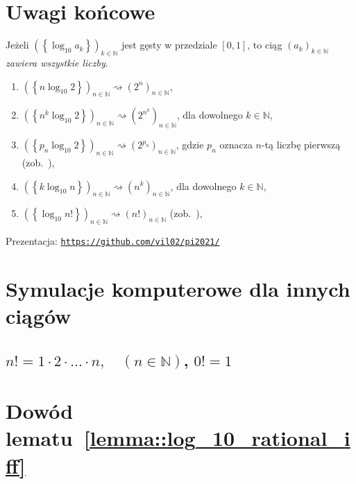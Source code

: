 \documentclass[aspectratio=169]{beamer}
\newcommand{\enumsymbol}{$\triangleright$}
\newcommand{\N}{\mathbb{N}}
\newcommand{\myGithubLink}{https://github.com/vil02/}
\newcommand{\importFromTmpData}[1]{{#1}}
\newcommand{\define}[1]{\textcolor{colorOfDefinition}{\textit{#1}}}
\newcommand{\paren}[1]{\!\left(#1 \right)}
\newcommand{\fracpart}[1]{\left\{ #1 \right\}}
\newcommand{\link}[1]{\href{#1}{\texttt{#1}}}
\begin{document}
\section{Uwagi końcowe}
\begin{frame}
  \begin{theorem}
    Jeżeli $\paren{{\fracpart{\log_{10} a_k}}}_{k \in \N}$ jest gęsty w przedziale  $[0, 1]$, to
    ciąg ${\paren{a_k}}_{k \in \N}$ \define{zawiera wszystkie liczby}.
  \end{theorem}
  \pause{}
  \begin{example}
  \begin{enumerate}[label=\enumsymbol]
    \item<+-> $\paren{\fracpart{n\log_{10}2}}_{n \in \N} \rightsquigarrow \paren{2^n}_{n \in \N}$,
    \item<+-> $\paren{\fracpart{n^k\log_{10}2}}_{n \in \N} \rightsquigarrow \paren{2^{n^k}}_{n \in \N}$, dla dowolnego $k \in \N$,
    \item<+-> $\paren{\fracpart{p_n\log_{10}2}}_{n \in \N} \rightsquigarrow \paren{2^{p_n}}_{n \in \N}$, gdzie $p_n$ oznacza $n$-tą liczbę pierwszą (zob.~\cite{Vinogradov1948}),
    \item<+-> $\paren{\fracpart{k\log_{10}n}}_{n \in \N} \rightsquigarrow \paren{n^k}_{n \in \N}$, dla dowolnego $k \in \N$,
    \item<+-> $\paren{\fracpart{\log_{10}n!}}_{n \in \N} \rightsquigarrow\paren{n!}_{n \in \N}$ (zob.~\cite{Diaconis1977}),
  \end{enumerate}
  \end{example}
  \onslide<+-> Prezentacja: \link{\myGithubLink pi2021/}
\end{frame}

\appendix

\section{Symulacje komputerowe dla innych ciągów}

\importFromTmpData{\powSubstrPlotsTex}

\subsection{\texorpdfstring{$n! = 1\cdot2\cdot \ldots \cdot n, \quad \paren{n \in \N}$, $0! = 1$}{Silnia}} %

\importFromTmpData{\factorialSubstrPlotsTex}


\section{\texorpdfstring{Dowód lematu~\protect\ref{lemma::log_10_rational_iff}}{Dowód warunku równoważnego wymierności logarytmu dziesiętnego}}
\end{document}
